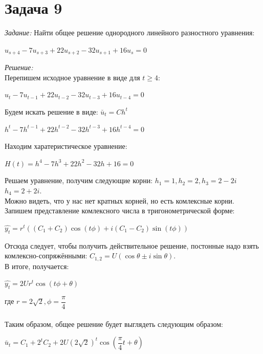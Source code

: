 \documentclass[14pt,fleqn]{extarticle}
\begin{document}
	\section*{Задача 9}
	\textit{Задание:} Найти общее решение однородного линейного разностного уравнения:
	\begin{center}
		$u_{s+4} - 7u_{s+3} + 22u_{s+2} - 32u_{s+1} + 16u_s = 0$
	\end{center}

	\textit{Решение:}\\
	Перепишем исходное уравнение в виде для $t \geq 4$:
	\begin{center}
		$u_{t} - 7u_{t-1} + 22u_{t-2} - 32u_{t-3} + 16u_{t-4} = 0$
	\end{center}
	Будем искать решение в виде: $\breve{u_t} = Ch^t$
	\begin{center}
		$h^t - 7h^{t-1} + 22h^{t-2} - 32h^{t-3} + 16h^{t-4} = 0$
	\end{center}
	Находим харатеристическое уравнение:
	\begin{center}
		$H(t) = h^4 - 7h^3 + 22h^2 - 32h + 16 = 0$
	\end{center}
	Решаем уравнение, получим следующие корни: $h_1 = 1, h_2 = 2, h_3 = 2-2i$\\$h_4 = 2+2i$.\\
	Можно видеть, что у нас нет кратных корней, но есть комлексные корни. Запишем представление комлексного числа в тригонометрической форме:
	\begin{center}
		$\hat{y_t} = r^t((C_1+C_2)\cos(t\phi)+i(C_1-C_2)\sin(t\phi))$
	\end{center}
	Отсюда следует, чтобы получить действительное решение, постонные надо взять комлексно-сопряжёнными: $C_{1,2} = U(\cos\theta \pm i\sin\theta)$.\\
	В итоге, получается:
	\begin{center}
		$\hat{y_t} = 2Ur^t\cos(t\phi+\theta)$
	\end{center}
	где $r = 2\sqrt{2}, \phi = \dfrac{\pi}{4}$\\\\
	Таким образом, общее решение будет выглядеть следующим образом:
	\begin{center}
		$\breve{u_t} = C_1 + 2^tC_2 + 2U(2\sqrt{2})^t\cos(\dfrac{\pi}{4}t+\theta)$
	\end{center}
\end{document}
